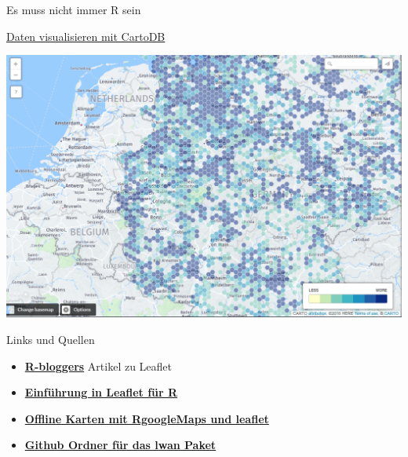 \documentclass[ignorenonframetext,]{beamer}
\begin{document}
\begin{frame}{Es muss nicht immer R sein}
\protect\hypertarget{es-muss-nicht-immer-r-sein}{}

\begin{block}{\href{https://japhilko.carto.com/dashboard}{Daten
visualisieren mit CartoDB}}

\includegraphics{figure/CartoDB.PNG}

\end{block}

\end{frame}

\begin{frame}{Links und Quellen}
\protect\hypertarget{links-und-quellen}{}

\begin{itemize}
\item
  \href{http://www.r-bloggers.com/the-leaflet-package-for-online-mapping-in-r/}{\textbf{R-bloggers}}
  Artikel zu Leaflet
\item
  \href{https://rstudio.github.io/leaflet/}{\textbf{Einführung in
  Leaflet für R}}
\item
  \href{https://blog.hwr-berlin.de/codeandstats/category/scientific-software/r/}{\textbf{Offline
  Karten mit RgoogleMaps und leaflet}}
\item
  \href{https://github.com/ropensci/lawn}{\textbf{Github Ordner für das
  lwan Paket}}
\end{itemize}

\end{frame}
\end{document}
